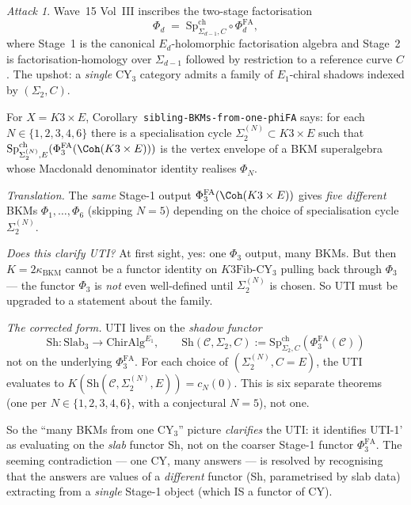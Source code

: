 \documentclass[11pt]{amsart}
\theoremstyle{definition}
\theoremstyle{remark}
\newtheorem{attack}[theorem]{Attack}
\newcommand{\CY}{\mathrm{CY}}
\newcommand{\kBKM}{\kappa_{\mathrm{BKM}}}
\newcommand{\SpCh}{\mathrm{Sp}^{\mathrm{ch}}}
\newcommand{\Sigmad}{\Sigma_{d-1}}
\newcommand{\PhiFA}{\Phi^{\mathrm{FA}}}
\begin{document}
\begin{attack}
Wave~15 Vol~III inscribes the two-stage factorisation
\[
\Phi_d \;=\; \SpCh_{\Sigmad, C} \circ \PhiFA_d,
\]
where Stage~1 is the canonical $E_d$-holomorphic factorisation algebra and Stage~2 is
factorisation-homology over $\Sigmad$ followed by restriction to a reference curve $C$. The
upshot: a \emph{single} CY$_3$ category admits a family of $E_1$-chiral shadows indexed by
$(\Sigma_2, C)$.

For $X = K3 \times E$, Corollary~\texttt{sibling-BKMs-from-one-phiFA} says: for each
$N \in \{1, 2, 3, 4, 6\}$ there is a specialisation cycle $\Sigma_2^{(N)} \subset K3 \times E$
such that $\SpCh_{\Sigma_2^{(N)}, E}(\PhiFA_3(\Coh(K3 \times E)))$ is the vertex envelope of a
BKM superalgebra whose Macdonald denominator identity realises $\Phi_N$.

\emph{Translation.} The \emph{same} Stage-1 output $\PhiFA_3(\Coh(K3 \times E))$ gives \emph{five
different} BKMs $\Phi_1, \ldots, \Phi_6$ (skipping $N = 5$) depending on the choice of
specialisation cycle $\Sigma_2^{(N)}$.

\emph{Does this clarify UTI?} At first sight, yes: one $\Phi_3$ output, many BKMs. But then
$K = 2\kBKM$ cannot be a functor identity on $K3\mathrm{Fib}\text{-}\CY_3$ pulling back through
$\Phi_3$ --- the functor $\Phi_3$ is \emph{not} even well-defined until $\Sigma_2^{(N)}$ is
chosen. So UTI must be upgraded to a statement about the family.

\emph{The corrected form.} UTI lives on the \emph{shadow functor}
\[
\mathrm{Sh}: \mathrm{Slab}_3 \to \mathrm{ChirAlg}^{E_1},
\qquad \mathrm{Sh}(\mathcal{C}, \Sigma_2, C)
:= \SpCh_{\Sigma_2, C}(\PhiFA_3(\mathcal{C}))
\]
not on the underlying $\PhiFA_3$. For each choice of $(\Sigma_2^{(N)}, C = E)$, the UTI evaluates
to $K(\mathrm{Sh}(\mathcal{C}, \Sigma_2^{(N)}, E)) = c_N(0)$. This is six separate theorems
(one per $N \in \{1, 2, 3, 4, 6\}$, with a conjectural $N=5$), not one.

So the ``many BKMs from one CY$_3$'' picture \emph{clarifies} the UTI: it identifies UTI-1' as
evaluating on the \emph{slab} functor $\mathrm{Sh}$, not on the coarser Stage-1 functor
$\PhiFA_3$. The seeming contradiction --- one CY, many answers --- is resolved by recognising
that the answers are values of a \emph{different} functor (Sh, parametrised by slab data)
extracting from a \emph{single} Stage-1 object (which IS a functor of CY).
\end{attack}
\end{document}
